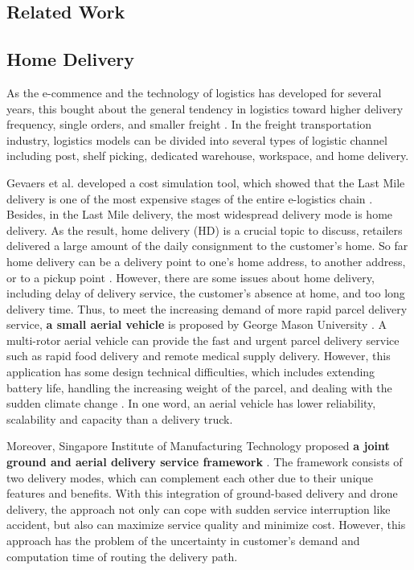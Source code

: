 \documentclass[12pt]{ksthesis}
\begin{document}
\begin{thesis}
{  


\chapter{Related Work} \label{Chap:Related}

\section{Home Delivery}
As the e-commence and the technology of logistics has developed for several years, this bought about the general tendency in logistics toward higher delivery frequency, single orders, and smaller freight \cite{Visser2014}. In the freight transportation industry, logistics models can be divided into several types of logistic channel including post, shelf picking, dedicated warehouse, workspace, and home delivery.

Gevaers et al. developed a cost simulation tool, which showed that the Last Mile delivery is one of the most expensive stages of the entire e-logistics chain \cite{Gevaers2014}. Besides, in the Last Mile delivery, the most widespread delivery mode is home delivery. As the result, home delivery (HD) is a crucial topic to discuss, retailers delivered a large amount of the daily consignment to the customer’s home. So far home delivery can be a delivery point to one’s home address, to another address, or to a pickup point  \cite{Zhou2016}. However, there are some issues about home delivery, including delay of delivery service, the customer’s absence at home, and too long delivery time. Thus, to meet the increasing demand of more rapid parcel delivery service, \textbf{a small aerial vehicle} is proposed by George Mason University \cite{Ali2015}. A multi-rotor aerial vehicle can provide the fast and urgent parcel delivery service such as rapid food delivery and remote medical supply delivery. However, this application has some design technical difficulties, which includes extending battery life, handling the increasing weight of the parcel, and dealing with the sudden climate change \cite{Ali2015}. In one word, an aerial vehicle has lower reliability, scalability and capacity than a delivery truck.

Moreover, Singapore Institute of Manufacturing Technology proposed \textbf{a joint ground and aerial delivery service framework} \cite{Sawadsitang2018} . The framework consists of two delivery modes, which can complement each other due to their unique features and benefits. With this integration of ground-based delivery and drone delivery, the approach not only can cope with sudden service interruption like accident, but also can maximize service quality and minimize cost. However, this approach has the problem of the uncertainty in customer’s demand and computation time of routing the delivery path. 

}
\end{thesis}
\end{document}
